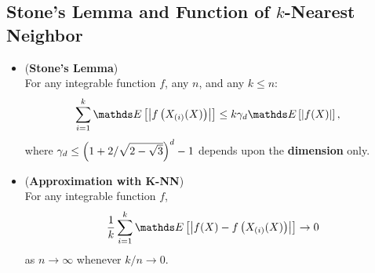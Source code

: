 \documentclass[11pt]{article}
\begin{document}
\subsection{Stone's Lemma and Function of $k$-Nearest Neighbor}
\begin{itemize}
\item 
\begin{lemma} (\textbf{Stone's Lemma})  \citep{devroye2013probabilistic}\\
For any integrable function $f$, any $n$, and any $k \le n$:
\begin{align}
\sum_{i=1}^{k}\E{}{\abs{f\paren{X_{(i)}(X)}}} &\le k \gamma_d \E{}{\abs{f(X)}}, \label{eqn: stone_lemma}
\end{align}
where $\gamma_d \le \left(1+ 2/\sqrt{2 - \sqrt{3}}\right)^d - 1$ depends upon the \textbf{dimension} only.
\end{lemma}

\item \begin{lemma} (\textbf{Approximation with K-NN})  \citep{devroye2013probabilistic}\\
For any integrable function $f$,
\begin{align*}
\frac{1}{k}\sum_{i=1}^{k}\E{}{\abs{f(X) - f\paren{X_{(i)}(X)}}} \to 0
\end{align*} as $n \rightarrow \infty$ whenever $k/n \rightarrow 0$.
\end{lemma}
\end{itemize}

\end{document}

